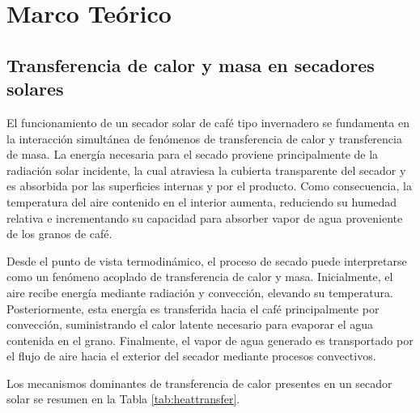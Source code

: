 
\clearpage
\chapter{Marco Teórico}


\section{Transferencia de calor y masa en secadores solares}

El funcionamiento de un secador solar de café tipo invernadero se fundamenta en la interacción simultánea de fenómenos de transferencia de calor y transferencia de masa. La energía necesaria para el secado proviene principalmente de la radiación solar incidente, la cual atraviesa la cubierta transparente del secador y es absorbida por las superficies internas y por el producto. Como consecuencia, la temperatura del aire contenido en el interior aumenta, reduciendo su humedad relativa e incrementando su capacidad para absorber vapor de agua proveniente de los granos de café.

Desde el punto de vista termodinámico, el proceso de secado puede interpretarse como un fenómeno acoplado de transferencia de calor y masa. Inicialmente, el aire recibe energía mediante radiación y convección, elevando su temperatura. Posteriormente, esta energía es transferida hacia el café principalmente por convección, suministrando el calor latente necesario para evaporar el agua contenida en el grano. Finalmente, el vapor de agua generado es transportado por el flujo de aire hacia el exterior del secador mediante procesos convectivos.

Los mecanismos dominantes de transferencia de calor presentes en un secador solar se resumen en la Tabla \ref{tab:heattransfer}.

